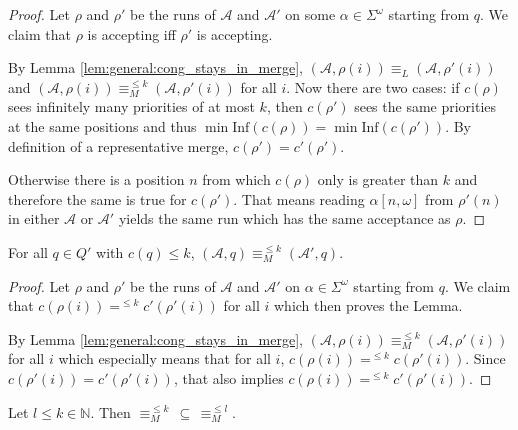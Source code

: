 \begin{proof} 
	Let $\rho$ and $\rho'$ be the runs of $\mathcal{A}$ and $\mathcal{A}'$ on some $\alpha \in \Sigma^\omega$ starting from $q$. We claim that $\rho$ is accepting iff $\rho'$ is accepting.
	
	By Lemma \ref{lem:general:cong_stays_in_merge}, $(\mathcal{A}, \rho(i)) \equiv_L (\mathcal{A}, \rho'(i))$ and $(\mathcal{A}, \rho(i)) \equiv_M^{\leq k} (\mathcal{A}, \rho'(i))$ for all $i$. Now there are two cases: if $c(\rho)$ sees infinitely many priorities of at most $k$, then $c(\rho')$ sees the same priorities at the same positions and thus $\min \text{Inf}(c(\rho)) = \min \text{Inf}(c(\rho'))$. By definition of a representative merge, $c(\rho') = c'(\rho')$.
	
	 Otherwise there is a position $n$ from which $c(\rho)$ only is greater than $k$ and therefore the same is true for $c(\rho')$. That means reading $\alpha[n,\omega]$ from $\rho'(n)$ in either $\mathcal{A}$ or $\mathcal{A}'$ yields the same run which has the same acceptance as $\rho$.
\end{proof}

\begin{lem}
	For all $q \in Q'$ with $c(q) \leq k$, $(\mathcal{A}, q) \equiv_M^{\leq k} (\mathcal{A}', q)$.
	\label{lem:tremoore:merge_keep_tmoore}
\end{lem}

\begin{proof} 
	Let $\rho$ and $\rho'$ be the runs of $\mathcal{A}$ and $\mathcal{A}'$ on $\alpha \in \Sigma^\omega$ starting from $q$. We claim that $c(\rho(i)) =^{\leq k} c'(\rho'(i))$ for all $i$ which then proves the Lemma.
	
	By Lemma \ref{lem:general:cong_stays_in_merge}, $(\mathcal{A}, \rho(i)) \equiv_M^{\leq k} (\mathcal{A}, \rho'(i))$ for all $i$ which especially means that for all $i$, $c(\rho(i)) =^{\leq k} c(\rho'(i))$. Since $c(\rho'(i)) = c'(\rho'(i))$, that also implies $c(\rho(i)) =^{\leq k} c'(\rho'(i))$.
\end{proof}

\begin{lem}
	Let $l \leq k \in \mathbb{N}$. Then $\equiv_M^{\leq k} \,\subseteq\, \equiv_M^{\leq l}$.
	\label{lem:tremoore:moore_less_thresh_is_subset}
\end{lem}

